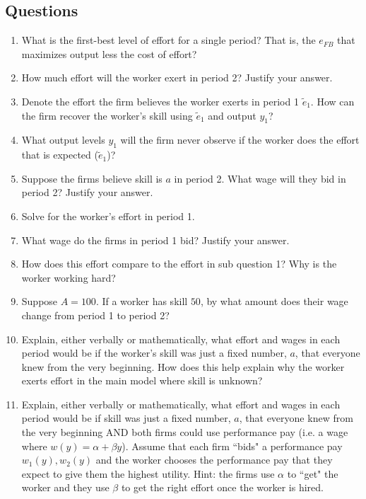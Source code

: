 \documentclass{article}
\begin{document}
\subsection*{Questions}
\begin{enumerate}

  \item What is the first-best level of effort for a single period? That is, the $e_{FB}$ that maximizes output less the cost of effort?


    \item How much effort will the worker exert in period 2? Justify your answer.



    \item Denote the effort the firm believes the worker exerts in period 1 $\tilde e_1$. How can the firm recover the worker's skill using $\tilde e_1$ and output $y_1$?


    \item What output levels $y_1$ will the firm never observe if the worker does the effort that is expected ($\tilde e_1$)?



    \item Suppose the firms believe skill is $a$ in period 2. What wage will they bid in period 2? Justify your answer.


    \item Solve for the worker's effort in period 1.



    \item What wage do the firms in period 1 bid? Justify your answer.


\item How does this effort compare to the effort in sub question 1? Why is the worker working hard?





    \item Suppose $A=100$. If a worker has skill $50$, by what amount does their wage change from period 1 to period 2?




\item Explain, either verbally or mathematically, what effort and wages in each period would be if the worker's skill was just a fixed number, $a$, that everyone knew from the very beginning. How does this help explain why the worker exerts effort in the main model where skill is unknown?


\item Explain, either verbally or mathematically, what effort and wages in each period would be if skill was just a fixed number, $a$, that everyone knew from the very beginning AND both firms could use performance pay (i.e. a wage where $w(y)=\alpha +\beta y$). Assume that each firm ``bids" a performance pay $w_1(y), w_2(y)$ and the worker chooses the performance pay that they expect to give them the highest utility. Hint: the firms use $\alpha$ to ``get" the worker and they use $\beta$ to get the right effort once the worker is hired.




\end{enumerate}
\end{document}
